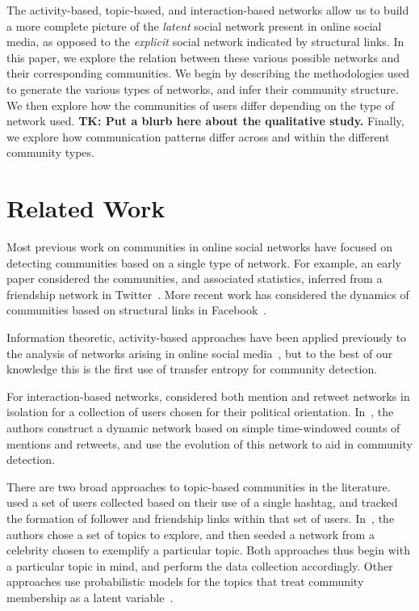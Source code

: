 The activity-based, topic-based, and interaction-based networks allow us to build a more complete picture of the \emph{latent} social network present in online social media, as opposed to the \emph{explicit} social network indicated by structural links. In this paper, we explore the relation between these various possible networks and their corresponding communities. We begin by describing the methodologies used to generate the various types of networks, and infer their community structure. We then explore how the communities of users differ depending on the type of network used. \textbf{TK: Put a blurb here about the qualitative study.} Finally, we explore how communication patterns differ across and within the different community types.

\section{Related Work}

Most previous work on communities in online social networks have focused on detecting communities based on a single type of network. For example, an early paper considered the communities, and associated statistics, inferred from a friendship network in Twitter~\cite{java2009we}. More recent work has considered the dynamics of communities based on structural links in Facebook~\cite{nguyen2011adaptive}.


Information theoretic, activity-based approaches have been applied previously to the analysis of networks arising in online social media~\cite{ver2012information,darmon2013detecting}, but to the best of our knowledge this is the first use of transfer entropy for community detection.

For interaction-based networks, \cite{conover2011political} considered both mention and retweet networks in isolation for a collection of users chosen for their political orientation. In~\cite{deitrick2013mutually}, the authors construct a dynamic network based on simple time-windowed counts of mentions and retweets, and use the evolution of this network to aid in community detection.

There are two broad approaches to topic-based communities in the literature. \cite{rossi2012conversation} used a set of users collected based on their use of a single hashtag, and tracked the formation of follower and friendship links within that set of users. In~\cite{lim2012following}, the authors chose a set of topics to explore, and then seeded a network from a celebrity chosen to exemplify a particular topic. Both approaches thus begin with a particular topic in mind, and perform the data collection accordingly. Other approaches use probabilistic models for the topics that treat community membership as a latent variable~\cite{yin2012latent}.


